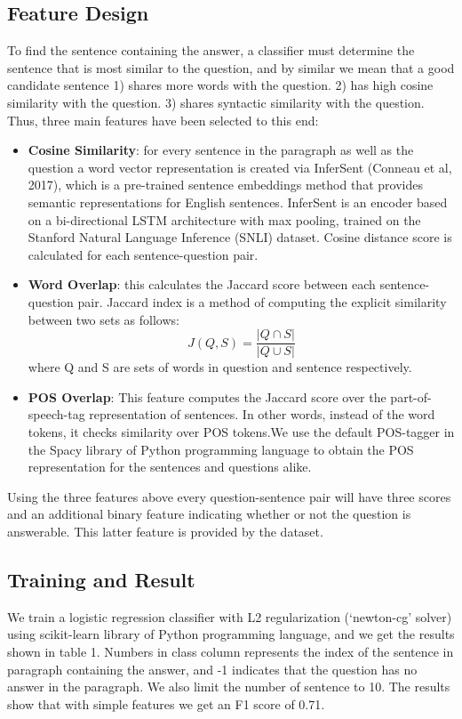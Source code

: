\subsection{Feature Design} 
To find the sentence containing the answer, a classifier must determine the sentence that is most similar to the question, and by similar we mean that a good candidate sentence  1) shares more words with the question. 2) has high cosine similarity with the question. 3) shares syntactic similarity with the question. Thus, three main features have been selected to this end:
\begin{itemize}
\item \textbf{Cosine Similarity}: for every sentence in the paragraph as well as the question a word vector representation is created via InferSent (Conneau et al, 2017), which is a pre-trained sentence embeddings method that provides semantic representations for English sentences. InferSent is an encoder based on a bi-directional LSTM architecture with max pooling, trained on the Stanford Natural Language Inference (SNLI) dataset. Cosine distance score is calculated for each sentence-question pair. 
\item \textbf{Word Overlap}: this calculates the Jaccard score between each sentence-question pair. Jaccard index is a method of computing the explicit similarity between two sets as follows: 
$$
J(Q,S) = \frac{|Q \cap S|}{|Q \cup S|}
$$
where Q and S are sets of words in question and sentence respectively.

\item \textbf{POS Overlap}: This feature computes the Jaccard score over the part-of-speech-tag representation of sentences. In other words, instead of the word tokens, it checks similarity over POS tokens.We use the default POS-tagger in the Spacy library of Python programming language to obtain the POS representation for the sentences and questions alike.
\end{itemize}
Using the three features above every question-sentence pair will have three scores and an additional binary feature indicating whether or not the question is answerable. This latter feature is provided by the dataset. 
\subsection{Training and Result} 
We train a logistic regression classifier with L2 regularization (`newton-cg' solver) using scikit-learn library of Python programming language, and we get the results shown in table 1. Numbers in class column represents the index of the sentence in paragraph containing the answer, and -1 indicates that the question has no answer in the paragraph. We also limit the number of sentence to 10. The results show that with simple features we get an F1 score of 0.71.


